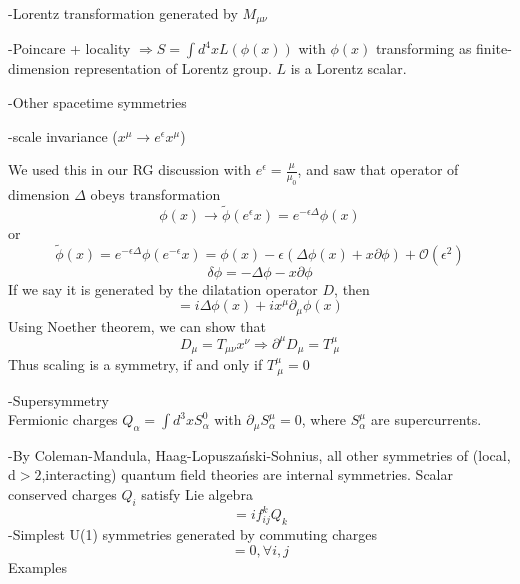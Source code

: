 \documentclass[type = bachelor]{fduthesis-en}
\begin{document}
-Lorentz transformation generated by $M_{\mu\nu}$

\bigskip
-Poincare + locality
$\Rightarrow S=\int d^4x L(\phi(x))$ with $\phi(x)$ transforming as finite-dimension representation of Lorentz group. $L$ is a Lorentz scalar.

\bigskip
\noindent-Other spacetime symmetries

-scale invariance ($x^\mu \rightarrow e^\epsilon x^\mu$)

We used this in our RG discussion with $e^\epsilon =\frac{\mu}{\mu_0}$, and saw that operator of dimension $\Delta$ obeys transformation 
\begin{equation}
\phi(x) \rightarrow \tilde{\phi}(e^\epsilon x)=e^{-\epsilon \Delta}\phi(x)
\end{equation}
or
\begin{equation}
\tilde{\phi}(x)=e^{-\epsilon \Delta}\phi(e^{-\epsilon}x)=\phi(x)-\epsilon(\Delta\phi(x)+x\partial\phi)+\mathcal{O}(\epsilon^2)
\end{equation}
\begin{equation}
\delta\phi=-\Delta\phi-x\partial\phi
\end{equation}
If we say it is generated by the dilatation operator $D$, then
\begin{equation}
[D, \phi(x)]=i\Delta\phi(x)+ix^\mu\partial_\mu\phi(x)
\end{equation}
Using Noether theorem, we can show that
\begin{equation}
D_\mu = T_{\mu\nu}x^\nu \Rightarrow \partial^\mu D_\mu = T^{\mu}_{\ \mu}
\end{equation}
Thus scaling is a symmetry, if and only if $T^{\mu}_{\ \mu}=0$

\noindent-Supersymmetry
\\Fermionic charges $Q_{\alpha}=\int d^3x S^0_\alpha$ with $\partial_\mu S_\alpha^\mu=0$, where $S_\alpha^\mu$ are supercurrents.

-By Coleman-Mandula, Haag-Lopusza\'{n}ski-Sohnius, all other symmetries of (local, d$>2$,interacting) quantum field theories are internal symmetries. Scalar conserved charges $Q_i$ satisfy Lie algebra
\begin{equation}
[Q_i,Q_j]=if^k_{ij}Q_k
\end{equation}
-Simplest U(1) symmetries generated by commuting charges
\begin{equation}
[Q_i,Q_j]=0, \forall i, j
\end{equation}
\bigskip
Examples
\end{document}
